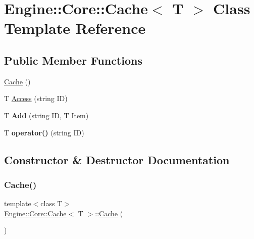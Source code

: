 \hypertarget{class_engine_1_1_core_1_1_cache}{}\section{Engine\+:\+:Core\+:\+:Cache$<$ T $>$ Class Template Reference}
\label{class_engine_1_1_core_1_1_cache}
\subsection*{Public Member Functions}
\begin{DoxyCompactItemize}
\item 
\hyperlink{class_engine_1_1_core_1_1_cache_a18673becad0012e4db441535744d8e0f}{Cache} ()
\item 
T \hyperlink{class_engine_1_1_core_1_1_cache_a1a4d83ac2cc8656acb5c99e4999e1551}{Access} (string ID)
\item 
\mbox{\label{class_engine_1_1_core_1_1_cache_aa9c31c77611ffd712133d233f374e3c5}} 
T {\bfseries Add} (string ID, T Item)
\item 
\mbox{\label{class_engine_1_1_core_1_1_cache_a29aacc1330978a6795feb5a51165ece6}} 
T {\bfseries operator()} (string ID)
\end{DoxyCompactItemize}


\subsection{Constructor \& Destructor Documentation}
\mbox{\label{class_engine_1_1_core_1_1_cache_a18673becad0012e4db441535744d8e0f}} 
\subsubsection{\texorpdfstring{Cache()}{Cache()}}
{\footnotesize\ttfamily template$<$class T$>$ \\
\hyperlink{class_engine_1_1_core_1_1_cache}{Engine\+::\+Core\+::\+Cache}$<$ T $>$\+::\hyperlink{class_engine_1_1_core_1_1_cache}{Cache} (\begin{DoxyParamCaption}{ }\end{DoxyParamCaption})\hspace{0.3cm}{\ttfamily [inline]}}

